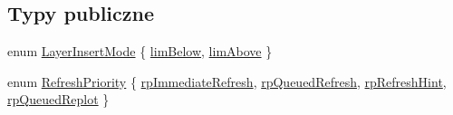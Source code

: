 \subsection*{Typy publiczne}
\begin{DoxyCompactItemize}
\item 
enum \hyperlink{class_q_custom_plot_a75a8afbe6ef333b1f3d47abb25b9add7}{Layer\+Insert\+Mode} \{ \hyperlink{class_q_custom_plot_a75a8afbe6ef333b1f3d47abb25b9add7aee39cf650cd24e68552da0b697ce4a93}{lim\+Below}, 
\hyperlink{class_q_custom_plot_a75a8afbe6ef333b1f3d47abb25b9add7a062b0b7825650b432a713c0df6742d41}{lim\+Above}
 \}
\item 
enum \hyperlink{class_q_custom_plot_a45d61392d13042e712a956d27762aa39}{Refresh\+Priority} \{ \hyperlink{class_q_custom_plot_a45d61392d13042e712a956d27762aa39aa6eda645ccf1a60635df3e8b71ea6ae2}{rp\+Immediate\+Refresh}, 
\hyperlink{class_q_custom_plot_a45d61392d13042e712a956d27762aa39acd6f1e590ea775d1ddee666428077f3e}{rp\+Queued\+Refresh}, 
\hyperlink{class_q_custom_plot_a45d61392d13042e712a956d27762aa39a49666a5854a68dbcca8b277b03331260}{rp\+Refresh\+Hint}, 
\hyperlink{class_q_custom_plot_a45d61392d13042e712a956d27762aa39a019650c6ddf308f97e811fbfff207a8f}{rp\+Queued\+Replot}
 \}
\end{DoxyCompactItemize}
